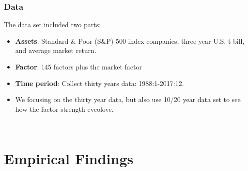 \documentclass[12pt]{beamer}
\begin{document}
	\begin{frame}
	\frametitle{Data}
	The data set included two parts:
	\begin{itemize}
		\item {\bf Assets}: Standard \& Poor (S\&P) 500 index companies, three year U.S. t-bill, and average market return.\\
		\item {\bf Factor}:  145 factors plus the market factor \\
		
		\item \textbf{Time period}:	Collect thirty years data: 1988:1-2017:12.\\
		
		\item We focusing on the thirty year data, but also use 10/20 year data set to see how the factor strength eveolove.\\
	\end{itemize}		\\

\end{frame}

\section{Empirical Findings}
\end{document}
